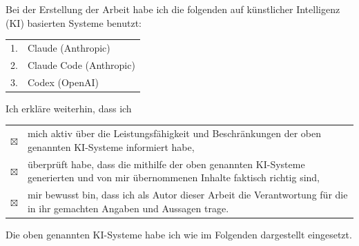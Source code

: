 \documentclass[
  paper=a4,
  fontsize=10pt,
  toc=bib,
  titlepage=firstiscover,
  headings=big
]{scrartcl}
\theoremstyle{definition}
\begin{document}

\vspace{0.8cm}

\noindent Bei der Erstellung der Arbeit habe ich die folgenden auf
k\"unstlicher Intelligenz (KI) basierten Systeme benutzt:

\vspace{0.4cm}
\noindent
\begin{tabular}{@{}ll@{}}
1. & Claude (Anthropic) \\
2. & Claude Code (Anthropic) \\
3. & Codex (OpenAI) \\
\end{tabular}

\vspace{0.6cm}

\noindent Ich erkl\"are weiterhin, dass ich

\vspace{0.3cm}
\noindent
\begin{tabular}{@{}p{1.4em}p{}@{}}
$\boxtimes$ & mich aktiv \"uber die Leistungsf\"ahigkeit und Beschr\"ankungen der
oben genannten KI-Systeme informiert habe, \\[0.4em]
$\boxtimes$ & \"uberpr\"uft habe, dass die mithilfe der oben genannten KI-Systeme
generierten und von mir \"ubernommenen Inhalte faktisch richtig sind, \\[0.4em]
$\boxtimes$ & mir bewusst bin, dass ich als Autor dieser Arbeit die Verantwortung
f\"ur die in ihr gemachten Angaben und Aussagen trage. \\
\end{tabular}

\vspace{0.6cm}

\noindent Die oben genannten KI-Systeme habe ich wie im Folgenden dargestellt
eingesetzt.

\vspace{0.3cm}
\end{document}
